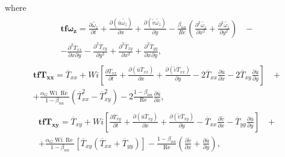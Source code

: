 \documentclass[preprint, 12pt]{elsarticle}
\begin{document}
where
\begin{gather}
    \begin{aligned}
        \mathbf{tf}\boldsymbol{\omega}_{\mathbf{z}} = \frac{\partial \widetilde{\omega_{z}}}{\partial t} + \frac{\partial (\overline{u}\widetilde{\omega_{z}})}{\partial x} + \frac{\partial (\widetilde{v}\widetilde{\omega_{z}})}{\partial y} - \frac{\beta_{nn}}{Re}\left(\frac{\partial^{2} \widetilde{\omega_{z}}}{\partial x^{2}} + \frac{\partial^{2} \widetilde{\omega_{z}}}{\partial y^{2}}\right) &~- \\ - \frac{\partial^{2}\overline{T}_{xx}}{\partial x^{}\partial y^{}} - \frac{\partial^{2}\overline{T}_{xy}}{\partial y^{2}} + \frac{\partial^{2}\overline{T}_{xy}}{\partial x^{2}} + \frac{\partial^{2}\overline{T}_{yy}}{\partial x^{}\partial y^{}},\label{eqwz_s_t_2}
    \end{aligned}
\end{gather}
\begin{gather}
    \begin{aligned}
        \mathbf{tfT_{xx}} = \overline{T}_{xx} + Wi\left[\frac{\partial \overline{T}_{xx}}{\partial t} + \frac{\partial (\overline{u}\overline{T}_{xx})}{\partial x} + \frac{\partial (\widetilde{v}\overline{T}_{xx})}{\partial y} - 2\overline{T}_{xx}\frac{\partial \overline{u}}{\partial x} - 2\overline{T}_{xy}\frac{\partial \overline{u}}{\partial y}\right] &~+ \\ + \frac{\alpha_{G}\operatorname{Wi}\operatorname{Re}}{1-\beta_{nn}}\left(\overline{T}_{xx}^{2} - \overline{T}_{xy}^{2}\right) - 2\frac{1-\beta_{nn}}{\operatorname{Re}}\frac{\partial \overline{u}}{\partial x},\label{eqtxx_s_t_2}
    \end{aligned}
\end{gather}
\begin{gather}
    \begin{aligned}
        \mathbf{tfT_{xy}} = \overline{T}_{xy} + Wi\left[\frac{\partial \overline{T}_{xy}}{\partial t} + \frac{\partial (\overline{u}\overline{T}_{xy})} {\partial x} + \frac{\partial(\widetilde{v}\overline{T}_{xy})}{\partial y} - \overline{T}_{xx}\frac{\partial\widetilde{v}}{\partial x} - \overline{T}_{yy}\frac{\partial \overline{u}}{\partial y}\right] &~+ \\ + \frac{\alpha_{G}\operatorname{Wi}\operatorname{Re}}{1-\beta_{nn}}\left[\overline{T}_{xy}\left(\overline{T}_{xx} + \overline{T}_{yy}\right)\right] - \frac{1-\beta_{nn}}{\operatorname{Re}}\left(\frac{\partial\widetilde{v}}{\partial x} + \frac{\partial \overline{u}}{\partial y}\right),\label{eqtxy_s_t_2}
    \end{aligned}
\end{gather}
\end{document}
